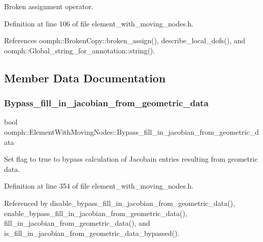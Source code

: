 Broken assignment operator. 



Definition at line 106 of file element\+\_\+with\+\_\+moving\+\_\+nodes.\+h.



References oomph\+::\+Broken\+Copy\+::broken\+\_\+assign(), describe\+\_\+local\+\_\+dofs(), and oomph\+::\+Global\+\_\+string\+\_\+for\+\_\+annotation\+::string().



\subsection{Member Data Documentation}
\mbox{\label{classoomph_1_1ElementWithMovingNodes_a69258bc20d31d8212f4096e46aa80b6b}} 
\subsubsection{\texorpdfstring{Bypass\+\_\+fill\+\_\+in\+\_\+jacobian\+\_\+from\+\_\+geometric\+\_\+data}{Bypass\_fill\_in\_jacobian\_from\_geometric\_data}}
{\footnotesize\ttfamily bool oomph\+::\+Element\+With\+Moving\+Nodes\+::\+Bypass\+\_\+fill\+\_\+in\+\_\+jacobian\+\_\+from\+\_\+geometric\+\_\+data\hspace{0.3cm}{\ttfamily [private]}}



Set flag to true to bypass calculation of Jacobain entries resulting from geometric data. 



Definition at line 354 of file element\+\_\+with\+\_\+moving\+\_\+nodes.\+h.



Referenced by disable\+\_\+bypass\+\_\+fill\+\_\+in\+\_\+jacobian\+\_\+from\+\_\+geometric\+\_\+data(), enable\+\_\+bypass\+\_\+fill\+\_\+in\+\_\+jacobian\+\_\+from\+\_\+geometric\+\_\+data(), fill\+\_\+in\+\_\+jacobian\+\_\+from\+\_\+geometric\+\_\+data(), and is\+\_\+fill\+\_\+in\+\_\+jacobian\+\_\+from\+\_\+geometric\+\_\+data\+\_\+bypassed().

